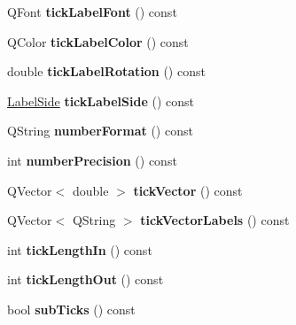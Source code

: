 \begin{DoxyCompactItemize}
\item 
\mbox{\label{classQCPAxis_a09f339b7125cf1094920f86687b88236}} 
Q\+Font {\bfseries tick\+Label\+Font} () const
\item 
\mbox{\label{classQCPAxis_a9e21b2326bb2de0b7a8efcd1efc0ce78}} 
Q\+Color {\bfseries tick\+Label\+Color} () const
\item 
\mbox{\label{classQCPAxis_a5c81e5d550266fdb9e11d96d1dc5713e}} 
double {\bfseries tick\+Label\+Rotation} () const
\item 
\mbox{\label{classQCPAxis_a1dc21783965a7c7d9c29c2a75d0a54e1}} 
\hyperlink{classQCPAxis_a24b13374b9b8f75f47eed2ea78c37db9}{Label\+Side} {\bfseries tick\+Label\+Side} () const
\item 
\mbox{\label{classQCPAxis_a20cc29c2f282a0e9efd8f32145e47be6}} 
Q\+String {\bfseries number\+Format} () const
\item 
\mbox{\label{classQCPAxis_a2562b6f3a4a01c7ed83a388042664998}} 
int {\bfseries number\+Precision} () const
\item 
\mbox{\label{classQCPAxis_a5aad9d6b34821ab0751dfc38dbc92a46}} 
Q\+Vector$<$ double $>$ {\bfseries tick\+Vector} () const
\item 
\mbox{\label{classQCPAxis_a1bd4a9036e0c9fc68b6f3df81f07e55f}} 
Q\+Vector$<$ Q\+String $>$ {\bfseries tick\+Vector\+Labels} () const
\item 
\mbox{\label{classQCPAxis_ace2accb350fd3f3f474280f58c1d61c5}} 
int {\bfseries tick\+Length\+In} () const
\item 
\mbox{\label{classQCPAxis_ad3ba6614ccddf351f133e0acdd4f021e}} 
int {\bfseries tick\+Length\+Out} () const
\item 
\mbox{\label{classQCPAxis_ad74153c38fd83b54c509cff249370beb}} 
bool {\bfseries sub\+Ticks} () const
\item 
\mbox{\label{classQCPAxis_af907c8ecc4624d1bf4a8f6f702e64fbe}} 

\end{DoxyCompactItemize}
